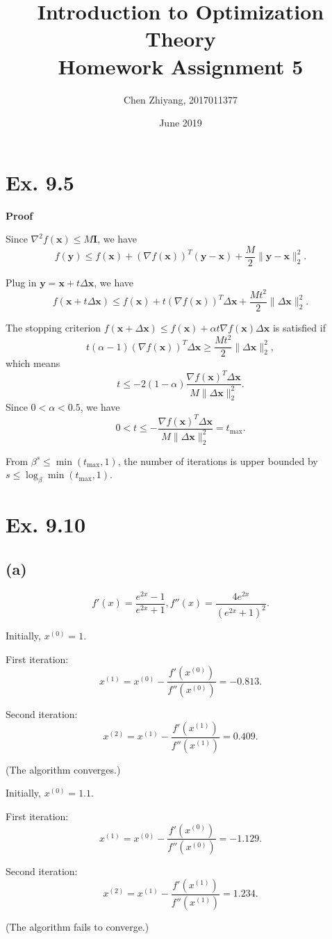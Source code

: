 \documentclass[12pt]{article}
\title{Introduction to Optimization Theory\\Homework Assignment 5}
\author{Chen Zhiyang, 2017011377}
\date{June 2019}
\begin{document}
\maketitle

\section*{Ex. 9.5}
\textbf{Proof}

Since $\nabla^2f(\bm{x})\le M\bm{I}$, we have $$f(\bm{y})\le f(\bm{x})+(\nabla f(\bm{x}))^T(\bm{y}-\bm{x})+\dfrac{M}{2}\|\bm{y}-\bm{x}\|_2^2.$$

Plug in $\bm{y}=\bm{x}+t\Delta\bm{x}$, we have $$f(\bm{x}+t\Delta\bm{x})\le f(\bm{x})+t(\nabla f(\bm{x}))^T\Delta\bm{x}+\dfrac{Mt^2}{2}\|\Delta\bm{x}\|_2^2.$$

The stopping criterion $f(\bm{x}+\Delta\bm{x})\le f(\bm{x})+\alpha t\nabla f(\bm{x})\Delta\bm{x}$ is satisfied if $$t(\alpha-1)(\nabla f(\bm{x}))^T\Delta\bm{x}\ge\dfrac{Mt^2}{2}\|\Delta\bm{x}\|_2^2,$$ which means $$t\le-2(1-\alpha)\dfrac{\nabla f(\bm{x})^T\Delta\bm{x}}{M\|\Delta\bm{x}\|_2^2}.$$ Since $0<\alpha<0.5$, we have $$0<t\le-\dfrac{\nabla f(\bm{x})^T\Delta\bm{x}}{M\|\Delta\bm{x}\|_2^2}=t_{\max}.$$

From $\beta^s\le \min(t_{\max},1)$, the number of iterations is upper bounded by $s\le\log_{\beta}\min(t_{\max},1)$.

\section*{Ex. 9.10}
\subsection*{(a)}
$$f'(x)=\dfrac{e^{2x}-1}{e^{2x}+1},f''(x)=\dfrac{4e^{2x}}{(e^{2x}+1)^2}.$$

Initially, $x^{(0)}=1$.

First iteration: $$x^{(1)}=x^{(0)}-\dfrac{f'(x^{(0)})}{f''(x^{(0)})}=-0.813.$$

Second iteration: $$x^{(2)}=x^{(1)}-\dfrac{f'(x^{(1)})}{f''(x^{(1)})}=0.409.$$

(The algorithm converges.)

Initially, $x^{(0)}=1.1$.

First iteration: $$x^{(1)}=x^{(0)}-\dfrac{f'(x^{(0)})}{f''(x^{(0)})}=-1.129.$$

Second iteration: $$x^{(2)}=x^{(1)}-\dfrac{f'(x^{(1)})}{f''(x^{(1)})}=1.234.$$

(The algorithm fails to converge.)
\end{document}
